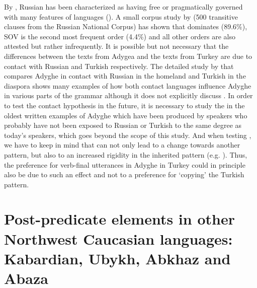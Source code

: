 \documentclass[output=paper,colorlinks,citecolor=brown, draft]{langscibook}
\begin{document}
By , Russian has been characterized as having free or pragmatically governed  with many features of  languages (\citealt{dryer2022slavic}). A small corpus study by \citet{billings2015corpus} (500 transitive clauses from the Russian National Corpus) has shown that  dominates (89.6\%), SOV is the second most frequent order (4.4\%) and all other orders are also attested but rather infrequently. It is possible but not necessary that the differences between the texts from Adygea and the texts from Turkey are due to contact with Russian and Turkish respectively. The detailed study by \citet{hohlig1997kontaktbedingter} that compares Adyghe in contact with Russian in the homeland and Turkish in the diaspora shows many examples of how both contact languages influence Adyghe in various parts of the grammar although it does not explicitly discuss . In order to test the contact hypothesis in the future, it is necessary to study the  in the oldest written examples of Adyghe which have been produced by speakers who probably have not been exposed to Russian or Turkish to the same degree as today's speakers, which goes beyond the scope of this study. And when testing , we have to keep in mind that  can not only lead to a change towards another pattern, but also to an increased rigidity in the inherited pattern (e.g. \citealt{namboodiripad2019english}). Thus, the preference for verb-final utterances in Adyghe in Turkey could in principle also be due to such an effect and not to a preference for `copying' the Turkish pattern.


\section{Post-predicate elements in other Northwest Caucasian languages: Kabardian, Ubykh, Abkhaz and Abaza}\label{Adyghe:ss:4}
\end{document}
